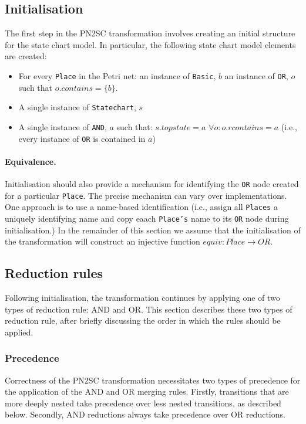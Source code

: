 \documentclass[submission,copyright,creativecommons]{eptcs}
\begin{document}
\subsection{Initialisation}
The first step in the PN2SC transformation involves creating an initial structure for the state chart model. In particular, the following state chart model elements are created:

\begin{itemize}
  \item For every \texttt{Place} in the Petri net:
    \subitem an instance of \texttt{Basic}, $b$
    \subitem an instance of \texttt{OR}, $o$ such that $o.contains = \{b\}$.
  \item A single instance of \texttt{Statechart}, $s$
  \item A single instance of \texttt{AND}, $a$ such that:
    \subitem $s.topstate = a$
    \subitem $\forall o: o.rcontains = a$ (i.e., every instance of \texttt{OR} is contained in $a$)
\end{itemize}

\paragraph{Equivalence.} Initialisation should also provide a mechanism for identifying the \texttt{OR} node created for a particular \texttt{Place}. The precise mechanism can vary over implementations. One approach is to use a name-based identification (i.e., assign all \texttt{Places} a uniquely identifying name and copy eaach \texttt{Place's} name to its \texttt{OR} node during initialisation.) In the remainder of this section we assume that the initialisation of the transformation will construct an injective function $equiv : Place \to OR$.

\subsection{Reduction rules}
Following initialisation, the transformation continues by applying one of two types of reduction rule: AND and OR. This section describes these two types of reduction rule, after briefly discussing the order in which the rules should be applied. 

\subsubsection{Precedence}
Correctness of the PN2SC transformation necessitates two types of precedence for the application of the AND and OR merging rules. Firstly, transitions that are more deeply nested take precedence over less nested transitions, as described below. Secondly, AND reductions always take precedence over OR reductions.
\end{document}
